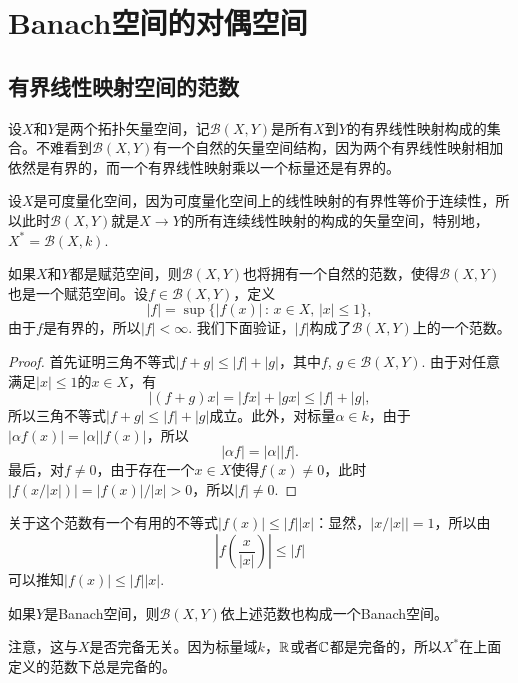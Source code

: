\chapter{Banach空间的对偶空间}

\section{有界线性映射空间的范数}

\begin{para}
设$X$和$Y$是两个拓扑矢量空间，记$\mathcal{B}(X,Y)$是所有$X$到$Y$的有界线性映射构成的集合。不难看到$\mathcal{B}(X,Y)$有一个自然的矢量空间结构，因为两个有界线性映射相加依然是有界的，而一个有界线性映射乘以一个标量还是有界的。

设$X$是可度量化空间，因为可度量化空间上的线性映射的有界性等价于连续性，所以此时$\mathcal{B}(X,Y)$就是$X\to Y$的所有连续线性映射的构成的矢量空间，特别地，$X^*=\mathcal{B}(X,k)$.

如果$X$和$Y$都是赋范空间，则$\mathcal{B}(X,Y)$也将拥有一个自然的范数，使得$\mathcal{B}(X,Y)$也是一个赋范空间。设$f\in \mathcal{B}(X,Y)$，定义
\[
	|f|=\sup\bigl\{|f(x)|\,:\,x\in X,\,|x|\leq 1\bigr\},
\]
由于$f$是有界的，所以$|f|<\infty$. 我们下面验证，$|f|$构成了$\mathcal{B}(X,Y)$上的一个范数。

\begin{proof}
首先证明三角不等式$|f+g|\leq |f|+|g|$，其中$f$, $g\in \mathcal{B}(X,Y)$. 由于对任意满足$|x|\leq 1$的$x\in X$，有
\[
	|(f+g)x|=|fx|+|gx|\leq |f|+|g|,
\]
所以三角不等式$|f+g|\leq |f|+|g|$成立。此外，对标量$\alpha\in k$，由于$|\alpha f(x)|=|\alpha||f(x)|$，所以
\[
	|\alpha f|=|\alpha||f|.
\]
最后，对$f\neq 0$，由于存在一个$x\in X$使得$f(x)\neq 0$，此时$|f(x/|x|)|=|f(x)|/|x|>0$，所以$|f|\neq 0$.
\end{proof}

关于这个范数有一个有用的不等式$|f(x)|\leq |f||x|$：显然，$|x/|x||=1$，所以由
\[
	\left|f\left(\frac{x}{|x|}\right)\right|\leq |f|
\]
可以推知$|f(x)|\leq |f||x|$. 
\end{para}

\begin{pro}
如果$Y$是Banach空间，则$\mathcal{B}(X,Y)$依上述范数也构成一个Banach空间。
\end{pro}

注意，这与$X$是否完备无关。因为标量域$k$，$\mathbb{R}$或者$\mathbb{C}$都是完备的，所以$X^*$在上面定义的范数下总是完备的。

